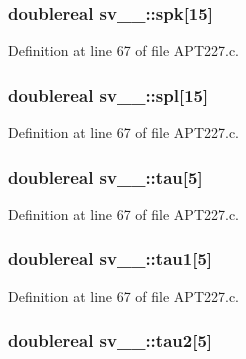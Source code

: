 \subsubsection[{\texorpdfstring{spk}{spk}}]{\setlength{\rightskip}{0pt plus 5cm}doublereal sv\+\_\+\_\+\+::spk\mbox{[}15\mbox{]}}\hypertarget{structsv__1___ab3ee5193bcda7da16cfdd8b14b777181}{}\label{structsv__1___ab3ee5193bcda7da16cfdd8b14b777181}


Definition at line 67 of file A\+P\+T227.\+c.

\subsubsection[{\texorpdfstring{spl}{spl}}]{\setlength{\rightskip}{0pt plus 5cm}doublereal sv\+\_\+\_\+\+::spl\mbox{[}15\mbox{]}}\hypertarget{structsv__1___a9d2548d7e4f5b5915224f24e04dedb2f}{}\label{structsv__1___a9d2548d7e4f5b5915224f24e04dedb2f}


Definition at line 67 of file A\+P\+T227.\+c.

\subsubsection[{\texorpdfstring{tau}{tau}}]{\setlength{\rightskip}{0pt plus 5cm}doublereal sv\+\_\+\_\+\+::tau\mbox{[}5\mbox{]}}\hypertarget{structsv__1___aef2306c3ea79924479cf1686c10bf058}{}\label{structsv__1___aef2306c3ea79924479cf1686c10bf058}


Definition at line 67 of file A\+P\+T227.\+c.

\subsubsection[{\texorpdfstring{tau1}{tau1}}]{\setlength{\rightskip}{0pt plus 5cm}doublereal sv\+\_\+\_\+\+::tau1\mbox{[}5\mbox{]}}\hypertarget{structsv__1___ad764beeb9e277771d8dd421d0c806709}{}\label{structsv__1___ad764beeb9e277771d8dd421d0c806709}


Definition at line 67 of file A\+P\+T227.\+c.

\subsubsection[{\texorpdfstring{tau2}{tau2}}]{\setlength{\rightskip}{0pt plus 5cm}doublereal sv\+\_\+\_\+\+::tau2\mbox{[}5\mbox{]}}\hypertarget{structsv__1___a8332ce70772904a47906d115936c980e}{}\label{structsv__1___a8332ce70772904a47906d115936c980e}


